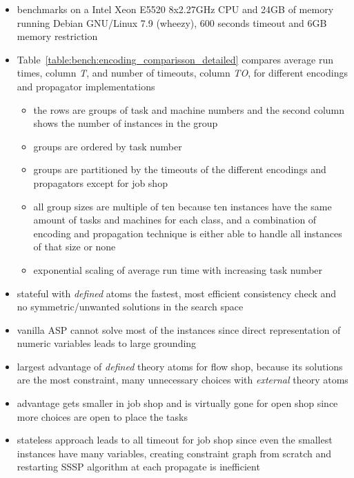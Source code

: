 \begin{itemize}
  \item benchmarks on a Intel Xeon E5520 8x2.27GHz CPU and 24GB of memory
running Debian GNU/Linux 7.9 (wheezy),
600 seconds timeout and 6GB memory restriction
  \item Table~\ref{table:bench:encoding_comparisson_detailed} compares average run times, column \emph{T}, and number of timeouts, column \emph{TO}, for different encodings and propagator implementations
  \begin{itemize}
    \item the rows are groups of task and machine numbers and the second column shows the number of instances in the group
    \item groups are ordered by task number
    \item groups are partitioned by the timeouts of the different encodings and propagators except for job shop
    \item all group sizes are multiple of ten because ten instances have the same amount of tasks and machines for each class, 
          and a combination of encoding and propagation technique is either able to handle all instances of that size or none
    \item exponential scaling of average run time with increasing task number
  \end{itemize}
  \item stateful with \emph{defined} atoms the fastest, most efficient consistency check and no symmetric/unwanted solutions in the search space
  \item vanilla ASP cannot solve most of the instances since direct representation of numeric variables leads to large grounding
  \item largest advantage of \emph{defined} theory atoms for flow shop, because its solutions are the most constraint, many unnecessary choices with \emph{external} theory atoms
  \item advantage gets smaller in job shop and is virtually gone for open shop since more choices are open to place the tasks
  \item stateless approach leads to all timeout for job shop since even the smallest instances have many variables, 
        creating constraint graph from scratch and restarting SSSP algorithm at each propagate is inefficient
  

\end{itemize}
